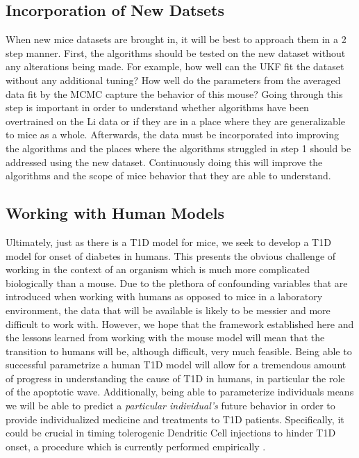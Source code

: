 \documentclass{article}
\begin{document}
\subsection{Incorporation of New Datsets}
When new mice datasets are brought in, it will be best to approach them in a 2 step manner. First, the algorithms should be tested on the new dataset without any alterations being made. For example, how well can the UKF fit the dataset without any additional tuning? How well do the parameters from the averaged data fit by the MCMC capture the behavior of this mouse? Going through this step is important in order to understand whether algorithms have been overtrained on the Li data or if they are in a place where they are generalizable to mice as a whole. Afterwards, the data must be incorporated into improving the algorithms and the places where the algorithms struggled in step 1 should be addressed using the new dataset. Continuously doing this will improve the algorithms and the scope of mice behavior that they are able to understand.

\subsection{Working with Human Models}
Ultimately, just as there is a T1D model for mice, we seek to develop a T1D model for onset of diabetes in humans. This presents the obvious challenge of working in the context of an organism which is much more complicated biologically than a mouse. Due to the plethora of confounding variables that are introduced when working with humans as opposed to mice in a laboratory environment, the data that will be available is likely to be messier and more difficult to work with. However, we hope that the framework established here and the lessons learned from working with the mouse model will mean that the transition to humans will be, although difficult, very much feasible. Being able to successful parametrize a human T1D model will allow for a tremendous amount of progress in understanding the cause of T1D in humans, in particular the role of the apoptotic wave. Additionally, being able to parameterize individuals means we will be able to predict a \emph{particular individual's} future behavior in order to provide individualized medicine and treatments to T1D patients. Specifically, it could be crucial in timing tolerogenic Dendritic Cell injections to hinder T1D onset, a procedure which is currently performed empirically \cite{shtylla2019mathematical}.



\end{document}
